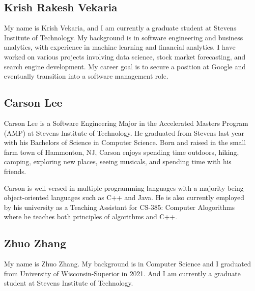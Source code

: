\subsection{Krish Rakesh Vekaria}
My name is Krish Vekaria, and I am currently a graduate student at Stevens Institute of Technology. My background is in software engineering and business analytics, with experience in machine learning and financial analytics. I have worked on various projects involving data science, stock market forecasting, and search engine development. My career goal is to secure a position at Google and eventually transition into a software management role.

\subsection{Carson Lee}
Carson Lee is a Software Engineering Major in the Accelerated Masters Program (AMP) at Stevens Institute of Technology. He graduated from Stevens last year with his Bachelors of Science in Computer Science. Born and raised in the small farm town of Hammonton, NJ, Carson enjoys spending time outdoors, hiking, camping, exploring new places, seeing musicals, and spending time with his friends.

Carson is well-versed in multiple programming languages with a majority being object-oriented languages such as C++ and Java. He is also currently employed by his university as a Teaching Assistant for CS-385: Computer Alogorithms where he teaches both principles of algorithms and C++.

\subsection{Zhuo Zhang}
My name is Zhuo Zhang. My background is in Computer Science and I graduated from University of Wisconsin-Superior in 2021. And I am currently a graduate student at Stevens Institute of Technology.